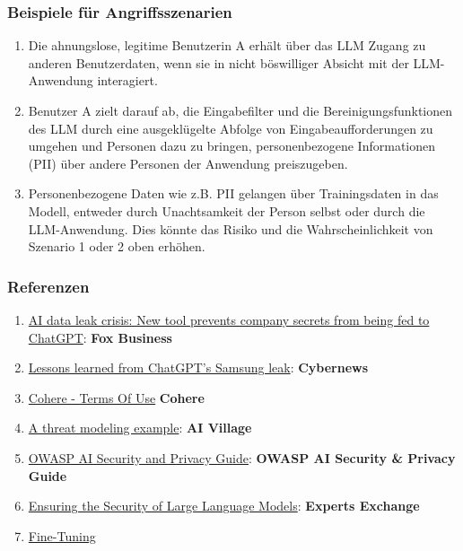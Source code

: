 \documentclass[
]{article}
\providecommand{\tightlist}{%
  \setlength{\itemsep}{0pt}\setlength{\parskip}{0pt}}
\begin{document}
\subsubsection{Beispiele für
Angriffsszenarien}\label{beispiele-fuxfcr-angriffsszenarien}

\begin{enumerate}
\def\labelenumi{\arabic{enumi}.}
\tightlist
\item
  Die ahnungslose, legitime Benutzerin A erhält über das LLM Zugang zu
  anderen Benutzerdaten, wenn sie in nicht böswilliger Absicht mit der
  LLM-Anwendung interagiert.
\item
  Benutzer A zielt darauf ab, die Eingabefilter und die
  Bereinigungsfunktionen des LLM durch eine ausgeklügelte Abfolge von
  Eingabeaufforderungen zu umgehen und Personen dazu zu bringen,
  personenbezogene Informationen (PII) über andere Personen der
  Anwendung preiszugeben.
\item
  Personenbezogene Daten wie z.B. PII gelangen über Trainingsdaten in
  das Modell, entweder durch Unachtsamkeit der Person selbst oder durch
  die LLM-Anwendung. Dies könnte das Risiko und die Wahrscheinlichkeit
  von Szenario 1 oder 2 oben erhöhen.
\end{enumerate}

\subsubsection{Referenzen}\label{referenzen}

\begin{enumerate}
\def\labelenumi{\arabic{enumi}.}
\tightlist
\item
  \href{https://www.foxbusiness.com/politics/ai-data-leak-crisis-prevent-company-secrets-chatgpt}{AI
  data leak crisis: New tool prevents company secrets from being fed to
  ChatGPT}: \textbf{Fox Business}
\item
  \href{https://cybernews.com/security/chatgpt-samsung-leak-explained-lessons/}{Lessons
  learned from ChatGPT's Samsung leak}: \textbf{Cybernews}
\item
  \href{https://cohere.com/terms-of-use}{Cohere - Terms Of Use}
  \textbf{Cohere}
\item
  \href{https://aivillage.org/large\%20language\%20models/threat-modeling-llm/}{A
  threat modeling example}: \textbf{AI Village}
\item
  \href{https://owasp.org/www-project-ai-security-and-privacy-guide/}{OWASP
  AI Security and Privacy Guide}: \textbf{OWASP AI Security \& Privacy
  Guide}
\item
  \href{https://www.experts-exchange.com/articles/38220/Ensuring-the-Security-of-Large-Language-Models-Strategies-and-Best-Practices.html}{Ensuring
  the Security of Large Language Models}: \textbf{Experts Exchange}
\item
  \href{https://github.com/OWASP/www-project-top-10-for-large-language-model-applications/wiki/Definitions}{Fine-Tuning}
\end{enumerate}
\end{document}
